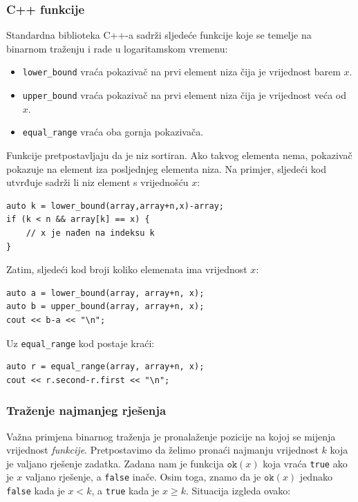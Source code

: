 \subsubsection{C++ funkcije}

Standardna biblioteka C++-a sadrži sljedeće funkcije
koje se temelje na binarnom traženju i rade u logaritamskom vremenu:

\begin{itemize}
\item \texttt{lower\_bound} vraća pokazivač na
prvi element niza čija je vrijednost barem $x$.
\item \texttt{upper\_bound} vraća pokazivač na
prvi element niza čija je vrijednost veća od $x$.
\item \texttt{equal\_range} vraća oba gornja pokazivača.
\end{itemize}

Funkcije pretpostavljaju da je niz sortiran.
Ako takvog elementa nema, pokazivač pokazuje na
element iza posljednjeg elementa niza.
Na primjer, sljedeći kod utvrđuje sadrži li
niz element s vrijednošću $x$:

\begin{lstlisting}
auto k = lower_bound(array,array+n,x)-array;
if (k < n && array[k] == x) {
    // x je nađen na indeksu k
}
\end{lstlisting}

Zatim, sljedeći kod broji koliko elemenata
ima vrijednost $x$:

\begin{lstlisting}
auto a = lower_bound(array, array+n, x);
auto b = upper_bound(array, array+n, x);
cout << b-a << "\n";
\end{lstlisting}

Uz \texttt{equal\_range} kod postaje kraći:

\begin{lstlisting}
auto r = equal_range(array, array+n, x);
cout << r.second-r.first << "\n";
\end{lstlisting}

\subsubsection{Traženje najmanjeg rješenja}

Važna primjena binarnog traženja je
pronalaženje pozicije na kojoj se mijenja vrijednost \emph{funkcije}.
Pretpostavimo da želimo pronaći najmanju vrijednost $k$
koja je valjano rješenje zadatka.
Zadana nam je funkcija $\texttt{ok}(x)$
koja vraća \texttt{true} ako je $x$ valjano rješenje,
a \texttt{false} inače.
Osim toga, znamo da je $\texttt{ok}(x)$ jednako \texttt{false}
kada je $x<k$, a \texttt{true} kada je $x \ge k$.
Situacija izgleda ovako:

